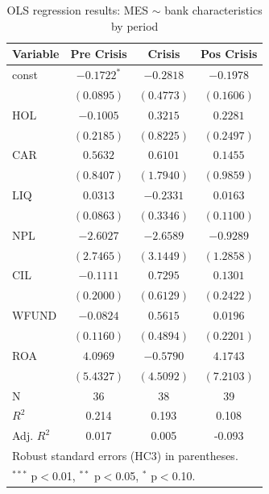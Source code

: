 \begin{table}[htbp]
\centering
\caption{OLS regression results: MES $\sim$ bank characteristics by period}
\label{tab:MES_regression}
\small
\begin{tabular}{lccc}
\toprule
\textbf{Variable} & \textbf{Pre Crisis} & \textbf{Crisis} & \textbf{Pos Crisis} \\
\midrule
const & $-0.1722^{*}$ & $-0.2818$ & $-0.1978$ \\
 & $(0.0895)$ & $(0.4773)$ & $(0.1606)$ \\
HOL & $-0.1005$ & $0.3215$ & $0.2281$ \\
 & $(0.2185)$ & $(0.8225)$ & $(0.2497)$ \\
CAR & $0.5632$ & $0.6101$ & $0.1455$ \\
 & $(0.8407)$ & $(1.7940)$ & $(0.9859)$ \\
LIQ & $0.0313$ & $-0.2331$ & $0.0163$ \\
 & $(0.0863)$ & $(0.3346)$ & $(0.1100)$ \\
NPL & $-2.6027$ & $-2.6589$ & $-0.9289$ \\
 & $(2.7465)$ & $(3.1449)$ & $(1.2858)$ \\
CIL & $-0.1111$ & $0.7295$ & $0.1301$ \\
 & $(0.2000)$ & $(0.6129)$ & $(0.2422)$ \\
WFUND & $-0.0824$ & $0.5615$ & $0.0196$ \\
 & $(0.1160)$ & $(0.4894)$ & $(0.2201)$ \\
ROA & $4.0969$ & $-0.5790$ & $4.1743$ \\
 & $(5.4327)$ & $(4.5092)$ & $(7.2103)$ \\
\midrule
N & 36 & 38 & 39 \\
$R^2$ & 0.214 & 0.193 & 0.108 \\
Adj. $R^2$ & 0.017 & 0.005 & -0.093 \\
\bottomrule
\multicolumn{4}{l}{\footnotesize Robust standard errors (HC3) in parentheses.} \\
\multicolumn{4}{l}{\footnotesize $^{***}$ p$<$0.01, $^{**}$ p$<$0.05, $^{*}$ p$<$0.10.} \\
\end{tabular}
\end{table}